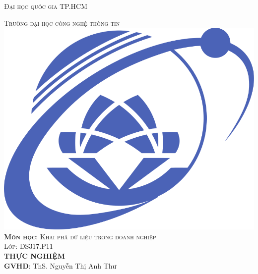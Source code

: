 \documentclass[12pt, a4]{article}
\begin{document}
\begin{titlepage}
    \begin{center}
        \begin{centering}
            \textsc{\LARGE Đại học quốc gia TP.HCM}
        
            
\textsc{\LARGE Trường đại học công nghệ thông tin}\\[1cm] 
        
        \includegraphics[scale=0.25]{figures/UIT_Logo.png}\\[1.0cm]
        

\textsc{\large \textbf{Môn học}: Khai phá dữ liệu trong doanh nghiệp}\\[0.5cm] 
\textsc{\large Lớp: DS317.P11}\\[1cm] 


{\huge \bfseries THỰC NGHIỆM}\\[0.3cm]
{\large \textbf{GVHD}: ThS. Nguyễn Thị Anh Thư}\\[1cm] 


\end{centering}
\end{center}
\end{titlepage}
\end{document}
